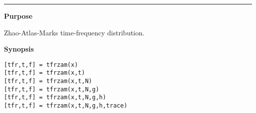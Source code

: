 

\hspace*{-1.6cm}{\Large \bf tfrzam}

\vspace*{-.4cm}
\hspace*{-1.6cm}\rule[0in]{16.5cm}{.02cm}
\vspace*{.2cm}

{\bf \large {}\selectfont Purpose}\\
\hspace*{1.5cm}
\begin{minipage}[t]{13.5cm}
Zhao-Atlas-Marks time-frequency distribution.
\end{minipage}
\vspace*{.5cm}

{\bf \large {}\selectfont Synopsis}\\
\hspace*{1.5cm}
\begin{minipage}[t]{13.5cm}
\begin{verbatim}
[tfr,t,f] = tfrzam(x)
[tfr,t,f] = tfrzam(x,t)
[tfr,t,f] = tfrzam(x,t,N)
[tfr,t,f] = tfrzam(x,t,N,g)
[tfr,t,f] = tfrzam(x,t,N,g,h)
[tfr,t,f] = tfrzam(x,t,N,g,h,trace)
\end{verbatim}
\end{minipage}
\vspace*{.5cm}

